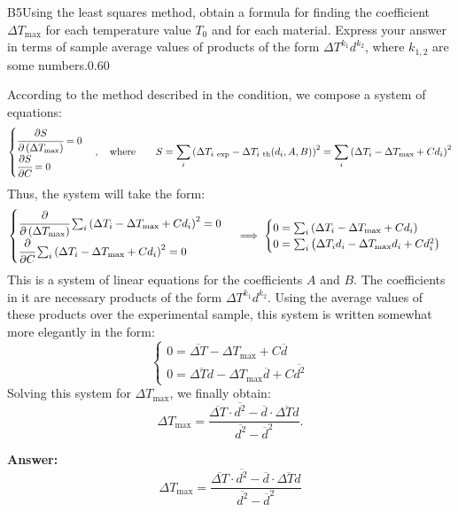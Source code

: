 \documentclass[11pt,a4paper]{article}
\begin{document}
\begin{solcard}{B5}{Using the least squares method, obtain a formula for finding the coefficient $\Delta T_{\max}$ for each temperature value $T_0$ and for each material. Express your answer in terms of sample average values of products of the form $\Delta T^{k_1}d^{k_2}$, where $k_{1,2}$ are some numbers.}{0.60}

According to the method described in the condition, we compose a system of equations:\[\begin{cases} \cfrac{\partial S}{\partial\left( \Delta T_{\max}\right)}=0\\ \cfrac{\partial S}{\partial C}=0\end{cases}, \quad  \text{where} \quad\quad S=\sum_i\left(\Delta T_{i\ \mathrm{exp}}-\Delta T_{i\ \mathrm{th}}(d_i, A, B)\right)^2=\sum_i\left(\Delta T_i-\Delta T_{\max}+Cd_i\right)^2\]Thus, the system will take the form:\[\begin{cases} \cfrac\partial{\partial \left(\Delta T_{\max}\right)}\sum_i\left(\Delta T_i-\Delta T_{\max}+Cd_i\right)^2=0\\\cfrac\partial{\partial C}\sum_i\left(\Delta T_i-\Delta T_{\max}+Cd_i\right)^2=0\end{cases}\implies\begin{cases}0=\sum_i\left(\Delta T_i-\Delta T_{\max}+Cd_i\right)\\0=\sum_i\left(\Delta T_id_i-\Delta T_{\max} d_i+Cd_i^2\right)\end{cases}\]This is a system of linear equations for the coefficients $A$ and $B$. The coefficients in it are necessary products of the form $\Delta T^{k_1}d^{k_2}$. Using the average values of these products over the experimental sample, this system is written somewhat more elegantly in the form:\[\begin{cases}0=\overline{\Delta T}-\Delta T_{\max}+C\overline d\\0=\overline{\Delta Td}-\Delta T_{\max}\overline d+C\overline{d^2}\end{cases}\]Solving this system for $\Delta T_{\max}$, we finally obtain:\[\Delta T_{\max}=\frac{\overline{\Delta T}\cdot\overline{d^2}-\overline d\cdot\overline{\Delta Td}}{\overline{d^2}-\overline d^2}.\]

\par\smallskip\noindent\textbf{Answer:} \[\Delta T_{\max}=\frac{\overline{\Delta T}\cdot\overline{d^2}-\overline d\cdot\overline{\Delta Td}}{\overline{d^2}-\overline d^2}\]
\end{solcard}
\end{document}
